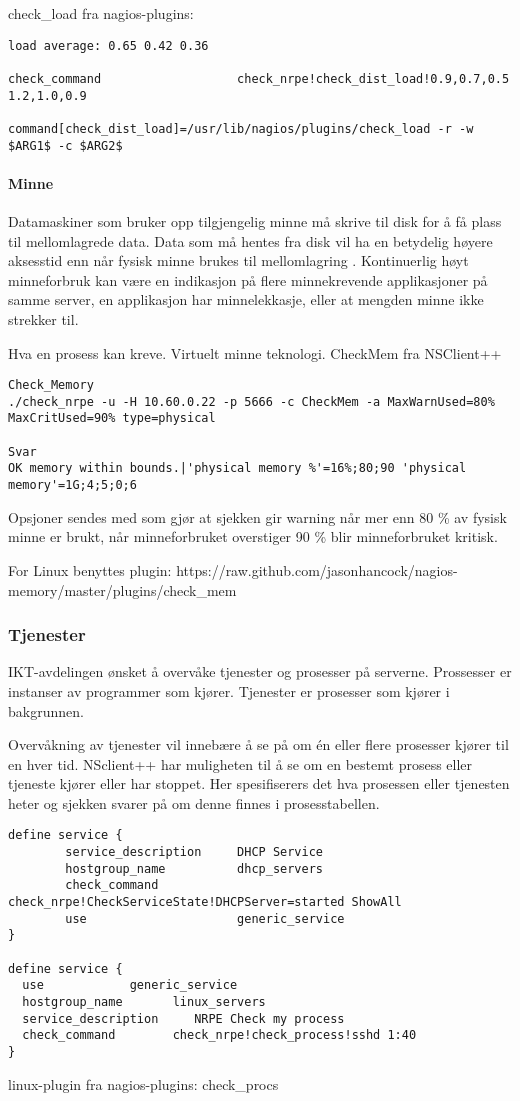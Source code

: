 check\_load fra nagios-plugins:
\begin{lstlisting}
load average: 0.65 0.42 0.36

check_command                   check_nrpe!check_dist_load!0.9,0.7,0.5 1.2,1.0,0.9

command[check_dist_load]=/usr/lib/nagios/plugins/check_load -r -w $ARG1$ -c $ARG2$
\end{lstlisting}

\paragraph{Minne}
Datamaskiner som bruker opp tilgjengelig minne må skrive til disk for å få plass til mellomlagrede data. Data som må hentes fra disk vil ha en betydelig høyere aksesstid enn når fysisk minne brukes til mellomlagring \cite{wiki:mem}. 
Kontinuerlig høyt minneforbruk kan være en indikasjon på flere minnekrevende applikasjoner på samme server, en applikasjon har minnelekkasje, eller at mengden minne ikke strekker til.

Hva en prosess kan kreve. Virtuelt minne teknologi. CheckMem fra NSClient++

\begin{lstlisting}
Check_Memory
./check_nrpe -u -H 10.60.0.22 -p 5666 -c CheckMem -a MaxWarnUsed=80% MaxCritUsed=90% type=physical

Svar
OK memory within bounds.|'physical memory %'=16%;80;90 'physical memory'=1G;4;5;0;6
\end{lstlisting}

Opsjoner sendes med som gjør at sjekken gir warning når mer enn 80 \% av fysisk minne er brukt, når minneforbruket overstiger 90 \% blir minneforbruket kritisk.

For Linux benyttes plugin: https://raw.github.com/jasonhancock/nagios-memory/master/plugins/check\_mem

\subsubsection{Tjenester}
IKT-avdelingen ønsket å overvåke tjenester og prosesser på serverne. Prossesser er instanser av programmer som kjører. Tjenester er prosesser som kjører i bakgrunnen. 

Overvåkning av tjenester vil innebære å se på om én eller flere prosesser kjører
til en hver tid. NSclient++ har muligheten til å se om en bestemt prosess eller tjeneste kjører eller har stoppet. Her spesifiserers det hva prosessen eller tjenesten heter og sjekken svarer på om denne finnes i prosesstabellen.
\begin{lstlisting}
define service {
        service_description     DHCP Service
        hostgroup_name          dhcp_servers
        check_command           check_nrpe!CheckServiceState!DHCPServer=started ShowAll
        use                     generic_service
}

define service {
  use            generic_service
  hostgroup_name       linux_servers
  service_description     NRPE Check my process
  check_command        check_nrpe!check_process!sshd 1:40
}
\end{lstlisting}
linux-plugin fra nagios-plugins: check\_procs 

